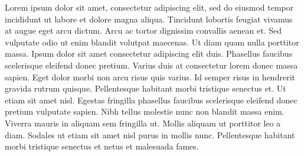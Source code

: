 Lorem ipsum dolor sit amet, consectetur adipiscing elit, sed do eiusmod tempor incididunt ut labore et dolore magna aliqua. Tincidunt lobortis feugiat vivamus at augue eget arcu dictum. Arcu ac tortor dignissim convallis aenean et. Sed vulputate odio ut enim blandit volutpat maecenas. Ut diam quam nulla porttitor massa. Ipsum dolor sit amet consectetur adipiscing elit duis. Phasellus faucibus scelerisque eleifend donec pretium. Varius duis at consectetur lorem donec massa sapien. Eget dolor morbi non arcu risus quis varius. Id semper risus in hendrerit gravida rutrum quisque. Pellentesque habitant morbi tristique senectus et. Ut etiam sit amet nisl. Egestas fringilla phasellus faucibus scelerisque eleifend donec pretium vulputate sapien. Nibh tellus molestie nunc non blandit massa enim. Viverra mauris in aliquam sem fringilla ut. Mollis aliquam ut porttitor leo a diam. Sodales ut etiam sit amet nisl purus in mollis nunc. Pellentesque habitant morbi tristique senectus et netus et malesuada fames.
